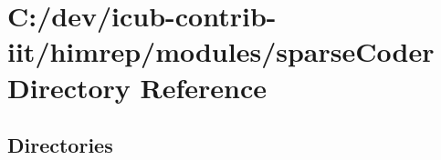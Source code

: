 \section{C\+:/dev/icub-\/contrib-\/iit/himrep/modules/sparse\+Coder Directory Reference}
\label{dir_9dd3b008de72e8e602d2490f6176d1d4}
\subsection*{Directories}
\begin{DoxyCompactItemize}
\end{DoxyCompactItemize}

